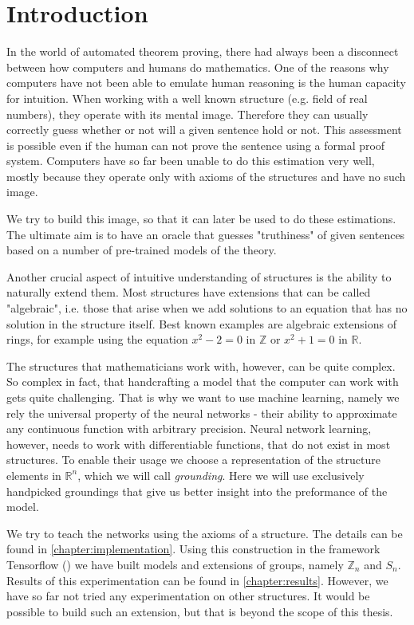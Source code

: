 \chapter*{Introduction}
\label{intro}

In the world of automated theorem proving, there had always been a disconnect between how computers and humans do mathematics. One of the reasons why computers have not been able to emulate human reasoning is the human capacity for intuition. When working with a well known structure (e.g. field of real numbers), they operate with its mental image. Therefore they can usually correctly guess whether or not will a given sentence hold or not. This assessment is possible even if the human can not prove the sentence using a formal proof system. Computers have so far been unable to do this estimation very well, mostly because they operate only with axioms of the structures and have no such image.

We try to build this image, so that it can later be used to do these estimations. The ultimate aim is to have an oracle that guesses "truthiness" of given sentences based on a number of pre-trained models of the theory. 

Another crucial aspect of intuitive understanding of structures is the ability to naturally extend them. Most structures have extensions that can be called "algebraic", i.e. those that arise when we add solutions to an equation that has no solution in the structure itself. Best known examples are algebraic extensions of rings, for example using the equation $x^2-2=0$ in $\mathbb{Z}$ or $x^2+1=0$ in $\mathbb{R}$.

The structures that mathematicians work with, however, can be quite complex. So complex in fact, that handcrafting a model that the computer can work with gets quite challenging. That is why we want to use machine learning, namely we rely the universal property of the neural networks - their ability to approximate any continuous function with arbitrary precision. Neural network learning, however, needs to work with differentiable functions, that do not exist in most structures. To enable their usage we choose a representation of the structure elements in $\mathbb{R}^n$, which we will call \textit{grounding}. Here we will use exclusively handpicked groundings that give us better insight into the preformance of the model.

We try to teach the networks using the axioms of a structure. The details can be found in \autoref{chapter:implementation}. Using this construction in the framework Tensorflow (\cite{tf}) we have built models and extensions of groups, namely $\mathbb{Z}_n$ and $S_n$. Results of this experimentation can be found in \autoref{chapter:results}. However, we have so far not tried any experimentation on other structures. It would be possible to build such an extension, but that is beyond the scope of this thesis. 